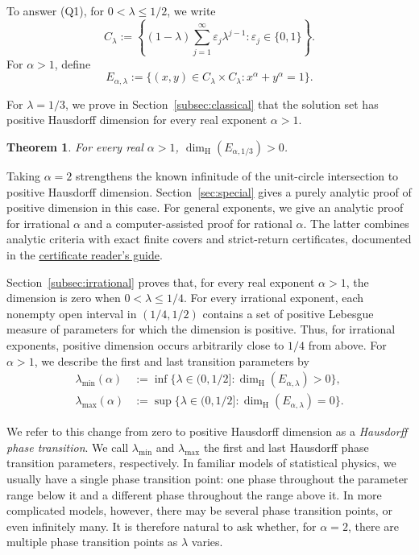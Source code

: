 \documentclass[11pt,a4paper]{amsart}
\numberwithin{equation}{section}
\newtheorem{theorem}{Theorem}[section]
\theoremstyle{definition}
\begin{document}
To answer (Q1), for \(0<\lambda\leq1/2\), we write
\[
C_\lambda:=
\left\{(1-\lambda)\sum_{j=1}^{\infty}
       \varepsilon_j\lambda^{j-1}:\varepsilon_j\in\{0,1\}\right\}.
\]
For \(\alpha>1\), define
\[
E_{\alpha,\lambda}:=
\{(x,y)\in C_\lambda\times C_\lambda:x^\alpha+y^\alpha=1\}.
\]

For \(\lambda=1/3\), we prove in Section~\ref{subsec:classical}
that the solution set has positive Hausdorff dimension for every
real exponent \(\alpha>1\).

\begin{theorem}\label{intro:integer-powers}
For every real \(\alpha>1\), \(\dim_{\mathrm H}(E_{\alpha,1/3})>0\).
\end{theorem}

Taking \(\alpha=2\) strengthens the known infinitude of the unit-circle
intersection to positive Hausdorff dimension. Section~\ref{sec:special}
gives a purely analytic proof of positive dimension in this case.
For general exponents, we give an analytic proof for irrational
\(\alpha\) and a computer-assisted proof for rational \(\alpha\).
The latter combines analytic criteria with exact finite covers and
strict-return certificates, documented in the
\href{https://github.com/Nero-17/LEAN-Formalisation-solutions-of-fermat-cantor-equation/blob/9ec893bcef7a71504234be897a16949c0a1f8313/docs/certificate-guide.pdf}{certificate reader's guide}.

Section~\ref{subsec:irrational} proves that, for every real exponent
\(\alpha>1\), the dimension is zero when \(0<\lambda\leq1/4\).
For every irrational exponent, each nonempty open interval in
\((1/4,1/2)\) contains a set of positive Lebesgue measure of
parameters for which the dimension is positive. Thus, for irrational
exponents, positive dimension occurs arbitrarily close to \(1/4\)
from above.
For \(\alpha>1\), we describe the first and last transition parameters by
\[
\begin{aligned}
\lambda_{\min}(\alpha)&:=
\inf\{\lambda\in(0,1/2]:\dim_{\mathrm H}(E_{\alpha,\lambda})>0\},\\
\lambda_{\max}(\alpha)&:=
\sup\{\lambda\in(0,1/2]:\dim_{\mathrm H}(E_{\alpha,\lambda})=0\}.
\end{aligned}
\]


We refer to this change from zero to positive Hausdorff dimension as
a \emph{Hausdorff phase transition}.
We call \(\lambda_{\min}\) and \(\lambda_{\max}\) the first and last
Hausdorff phase transition parameters, respectively.
In familiar models of statistical physics, we usually have a single
phase transition point: one phase throughout the parameter range
below it and a different phase throughout the range above it.
In more complicated models, however, there may be several phase
transition points, or even infinitely many. It is therefore natural
to ask whether, for \(\alpha=2\), there are multiple phase transition
points as \(\lambda\) varies.
\end{document}
